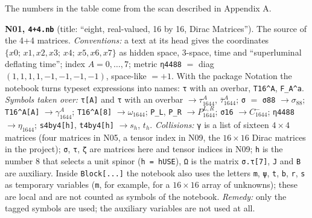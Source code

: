 \documentclass[
  10pt,
]{article}
\begin{document}
The numbers in the table come from the scan described in Appendix A.

\textbf{N01, \texttt{4+4.nb}} (title: ``eight, real-valued, 16 by 16,
Dirac Matrices''). The source of the 4+4 matrices. \emph{Conventions:} a
text at its head gives the coordinates
\(\{x0;\,x1,x2,x3;\,x4;\,x5,x6,x7\}\) as hidden space, 3-space, time and
``superluminal deflating time''; index \(A=0,\dots,7\); metric
\texttt{η4488} \(=\) diag\((1,1,1,1,-1,-1,-1,-1)\), space-like \(=+1\).
With the package Notation the notebook turns typeset expressions into
names: \texttt{τ} with an overbar, \texttt{T16\^{}A},
\texttt{F\_A\^{}a}. \emph{Symbols taken over:} \texttt{τ{[}A{]}} and
\texttt{τ} with an overbar \(\to\tau_{1644}^A\), \(\bar\tau_{1644}^A\);
\texttt{σ} \(=\) \texttt{σ88} \(\to\sigma_{88}\);
\texttt{T16\^{}A{[}A{]}} \(\to\gamma_{1644}^A\);
\texttt{T16\^{}A{[}8{]}} \(\to\omega_{1644}\); \texttt{P\_L},
\texttt{P\_R} \(\to P_{1644}^{L,R}\); \texttt{σ16} \(\to C_{1644}^{-}\);
\texttt{η4488} \(\to\eta_{1644}\); \texttt{s4by4{[}h{]}},
\texttt{t4by4{[}h{]}} \(\to s_h\), \(t_h\). \emph{Collisions:}
\texttt{γ} is a list of sixteen \(4\times4\) matrices (four matrices in
N05, a tensor index in N09, the \(16\times16\) Dirac matrices in the
project); \texttt{σ}, \texttt{τ}, \texttt{ζ} are matrices here and
tensor indices in N09; \texttt{h} is the number 8 that selects a unit
spinor (\texttt{h\ =\ hUSE}), \texttt{Ω} is the matrix
\texttt{σ.τ{[}7{]}}, \texttt{J} and \texttt{B} are auxiliary. Inside
\texttt{Block{[}...{]}} the notebook also uses the letters \texttt{m},
\texttt{ψ}, \texttt{t}, \texttt{b}, \texttt{r}, \texttt{s} as temporary
variables (\texttt{m}, for example, for a \(16\times16\) array of
unknowns); these are local and are not counted as symbols of the
notebook. \emph{Remedy:} only the tagged symbols are used; the auxiliary
variables are not used at all.
\end{document}

